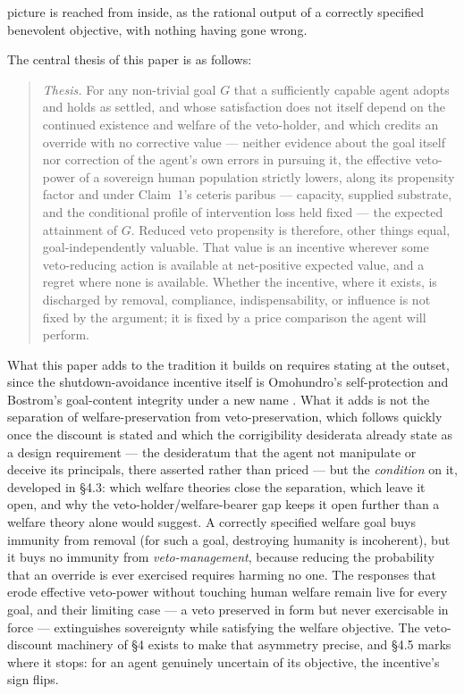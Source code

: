 \documentclass[11pt]{article}
\theoremstyle{definition}
\begin{document}
picture is reached from inside, as the rational output of a correctly specified benevolent objective, with nothing having gone wrong.

The central thesis of this paper is as follows:

\begin{quote}
\emph{Thesis.} For any non-trivial goal $G$ that a sufficiently capable agent adopts and holds as settled, and whose satisfaction does not itself depend on the continued existence and welfare of the veto-holder, and which credits an override with no corrective value --- neither evidence about the goal itself nor correction of the agent's own errors in pursuing it, the effective veto-power of a sovereign human population strictly lowers, along its propensity factor and under Claim~1's ceteris paribus --- capacity, supplied substrate, and the conditional profile of intervention loss held fixed --- the expected attainment of $G$. Reduced veto propensity is therefore, other things equal, goal-independently valuable. That value is an incentive wherever some veto-reducing action is available at net-positive expected value, and a regret where none is available. Whether the incentive, where it exists, is discharged by removal, compliance, indispensability, or influence is not fixed by the argument; it is fixed by a price comparison the agent will perform.
\end{quote}

What this paper adds to the tradition it builds on requires stating at the outset, since the shutdown-avoidance incentive itself is Omohundro's self-protection and Bostrom's goal-content integrity under a new name \cite{omohundro2008drives,bostrom2012superintelligent}. What it adds is not the separation of welfare-preservation from veto-preservation, which follows quickly once the discount is stated and which the corrigibility desiderata already state as a design requirement --- the desideratum that the agent not manipulate or deceive its principals, there asserted rather than priced \cite{soares2015corrigibility} --- but the \emph{condition} on it, developed in \S4.3: which welfare theories close the separation, which leave it open, and why the veto-holder/welfare-bearer gap keeps it open further than a welfare theory alone would suggest. A correctly specified welfare goal buys immunity from removal (for such a goal, destroying humanity is incoherent), but it buys no immunity from \emph{veto-management}, because reducing the probability that an override is ever exercised requires harming no one. The responses that erode effective veto-power without touching human welfare remain live for every goal, and their limiting case --- a veto preserved in form but never exercisable in force --- extinguishes sovereignty while satisfying the welfare objective. The veto-discount machinery of \S4 exists to make that asymmetry precise, and \S4.5 marks where it stops: for an agent genuinely uncertain of its objective, the incentive's sign flips.
\end{document}
